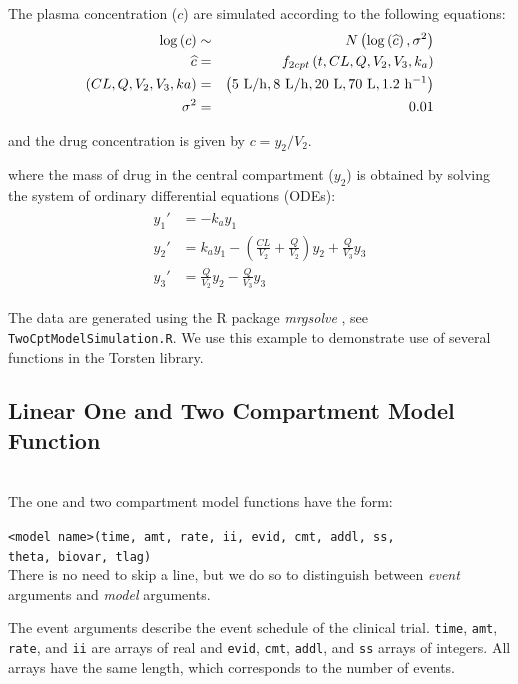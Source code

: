 \documentclass[11pt]{amsart}
\begin{document}
The plasma concentration ($c$) are simulated according to the following equations:
\begin{eqnarray*}
\log\left(c\right) &\sim& N\left(\log\left(\widehat{c}\right),\sigma^2\right) \\
 \widehat{c} &=& f_{2cpt}\left(t, CL, Q, V_2, V_3, k_a\right) \\
  \left(CL, Q, V_2, V_3, ka\right) &=& 
	\left(5\ {\rm L/h}, 8\  {\rm L/h}, 20\  {\rm L},  70\ {\rm L}, 1.2\ {\rm h^{-1}} \right) \\
  \sigma^2 &=& 0.01
\end{eqnarray*}

and the drug concentration is given by $c = y_2/V_2$.

where the mass of drug in the central compartment ($y_2$) is obtained by solving the system of ordinary differential equations (ODEs):
\begin{eqnarray}
  \begin{aligned}
  y_1' &= -k_a y_1 \\
  y_2' &= k_a y_1 - \left(\frac{CL}{V_2} + \frac{Q}{V_2}\right) y_2 +  \frac{Q}{V_3}  y_3  \\ 
  y_3' &= \frac{Q}{V_2} y_2 - \frac{Q}{V_3} y_3
  \end{aligned}
  \label{eq:TwoCpt}
\end{eqnarray}

The data are generated using the R package \textit{mrgsolve} \cite{mrgsolve:2017}, see \texttt{TwoCptModelSimulation.R}. We use this example to demonstrate use of several functions in the Torsten library.

\subsection{Linear One and Two Compartment Model Function} \ \\

The one and two compartment model functions have the form:

\texttt{<model name>(time, amt, rate, ii, evid, cmt, addl, ss,\\
\phantom{<model name>} theta,  biovar, tlag)} \\

There is no need to skip a line, but we do so to distinguish between \textit{event} arguments and \textit{model} arguments.

The event arguments describe the event schedule of the clinical trial. \texttt{time}, \texttt{amt}, \texttt{rate},  and \texttt{ii} are arrays of real and \texttt{evid}, \texttt{cmt}, \texttt{addl}, and \texttt{ss} arrays of integers. All arrays have the same length, which corresponds to the number of events.
\end{document}
